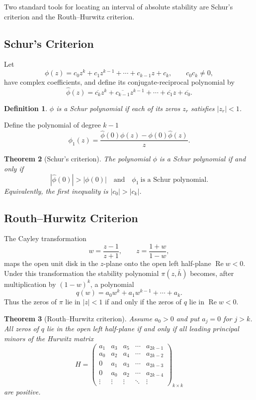\documentclass[11pt,a4paper]{article}
\numberwithin{equation}{section}
\theoremstyle{spacedplain}
\newtheorem{theorem}{Theorem}[section]
\theoremstyle{spaceddefinition}
\newtheorem{definition}[theorem]{Definition}
\theoremstyle{spacedremark}
\begin{document}
Two standard tools for locating an interval of absolute stability are
Schur's criterion and the Routh--Hurwitz criterion.

\subsection{Schur's Criterion}

Let
\[
  \phi(z)=c_0z^k+c_1z^{k-1}+\cdots+c_{k-1}z+c_k,
  \qquad c_0c_k\neq0,
\]
have complex coefficients, and define its conjugate-reciprocal
polynomial by
\[
  \widehat\phi(z)
  =\overline{c_k}z^k+\overline{c_{k-1}}z^{k-1}
   +\cdots+\overline{c_1}z+\overline{c_0}.
\]

\begin{definition}
\(\phi\) is a \emph{Schur polynomial} if each of its zeros \(z_r\)
satisfies \(|z_r|<1\).
\end{definition}

Define the polynomial of degree \(k-1\)
\[
  \phi_1(z)
  =\frac{\widehat\phi(0)\phi(z)-\phi(0)\widehat\phi(z)}{z}.
\]

\begin{theorem}[Schur's criterion]
The polynomial \(\phi\) is a Schur polynomial if and only if
\[
  |\widehat\phi(0)|>|\phi(0)|
  \quad\text{and}\quad
  \phi_1\ \text{is a Schur polynomial}.
\]
Equivalently, the first inequality is \(|c_0|>|c_k|\).
\end{theorem}

\subsection{Routh--Hurwitz Criterion}

The Cayley transformation
\[
  w=\frac{z-1}{z+1},
  \qquad
  z=\frac{1+w}{1-w},
\]
maps the open unit disk in the \(z\)-plane onto the open left
half-plane \(\operatorname{Re}w<0\).  Under this transformation the
stability polynomial \(\pi(z,\bar h)\) becomes, after multiplication by
\((1-w)^k\), a polynomial
\[
  q(w)=a_0w^k+a_1w^{k-1}+\cdots+a_k.
\]
Thus the zeros of \(\pi\) lie in \(|z|<1\) if and only if the zeros of
\(q\) lie in \(\operatorname{Re}w<0\).

\begin{theorem}[Routh--Hurwitz criterion]
Assume \(a_0>0\) and put \(a_j=0\) for \(j>k\).  All zeros of \(q\) lie
in the open left half-plane if and only if all leading principal minors
of the Hurwitz matrix
\[
  H=
  \begin{pmatrix}
    a_1&a_3&a_5&\cdots&a_{2k-1}\\
    a_0&a_2&a_4&\cdots&a_{2k-2}\\
    0&a_1&a_3&\cdots&a_{2k-3}\\
    0&a_0&a_2&\cdots&a_{2k-4}\\
    \vdots&\vdots&\vdots&\ddots&\vdots
  \end{pmatrix}_{k\times k}
\]
are positive.
\end{theorem}
\end{document}

